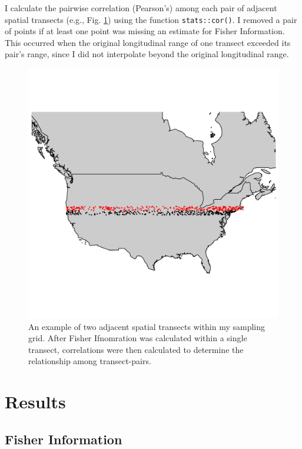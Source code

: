 \documentclass[12pt,twoside,openany]{reedthesis}
\begin{document}
I calculate the pairwise correlation (Pearson's) among each pair of
adjacent spatial transects (e.g., Fig. \ref{fig:adjacentTsectEx}) using
the function \texttt{stats::cor()}. I removed a pair of points if at
least one point was missing an estimate for Fisher Information. This
occurred when the original longitudinal range of one transect exceeded
its pair's range, since I did not interpolate beyond the original
longitudinal range.
\begin{figure}

{\centering \includegraphics[width=0.95\linewidth]{./chapterFiles/fisherSpatial/figures/figsCalledInDiss/transectSamplingEx_2rows} 

}

\caption{An example of two adjacent spatial transects within my sampling grid. After Fisher Ifnomration was calculated within a single transect, correlations were then calculated to determine the relationship among transect-pairs.}\label{fig:adjacentTsectEx}
\end{figure}
\section{Results}\label{results-1}

\subsection{Fisher Information}\label{fisher-information}
\end{document}
